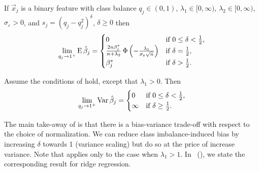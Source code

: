 \begin{theorem}
  \label{thm:classbalance-bias}
  If \(\vec{x}_j\) is a binary feature with class balance \(q_j \in (0, 1)\),
  \(\lambda_1 \in [0,\infty)\), \(\lambda_2 \in [0,\infty)\),
  \(\sigma_\varepsilon > 0\), and \(s_j = (q_j - q_j^2)^{\delta}\), \(\delta
  \geq 0\)  then
  \[
    \lim_{q_j \rightarrow 1^+} \operatorname{E} \hat{\beta}_j =
    \begin{cases}
      0                                                                                                  & \text{if } 0 \leq \delta < \frac{1}{2}, \\
      \frac{2n \beta_j^*}{n + \lambda_2} \operatorname{\Phi}\left(-\frac{\lambda_1}{\sigma_\varepsilon \sqrt{n}}\right) & \text{if } \delta = \frac{1}{2},        \\
      \beta^*_j                                                                                          & \text{if } \delta > \frac{1}{2}.
    \end{cases}
  \]
\end{theorem}

\begin{theorem}
  \label{thm:classbalance-variance}
  Assume the conditions of  hold, except that
  \(\lambda_1 > 0\). Then
  \[
    \lim_{q_j \rightarrow 1^+} \operatorname{Var} \hat{\beta}_j =
    \begin{cases}
      0      & \text{if } 0 \leq \delta < \frac{1}{2}, \\
      \infty & \text{if } \delta \geq \frac{1}{2}.
    \end{cases}
  \]
\end{theorem}

The main take-away of  is that there
is a bias-variance trade-off with respect to the choice of normalization. We can reduce
class imbalance-induced bias by increasing \(\delta\) towards 1 (variance scaling) but do
so at the price of increase variance. Note that  applies
only to the case when \(\lambda_1 > 1\). In
~(), we state the corresponding result
for ridge regression.


